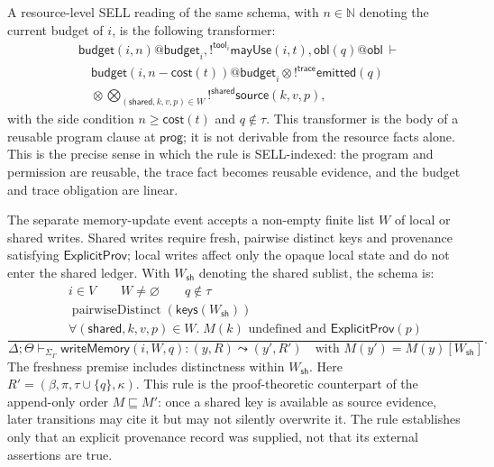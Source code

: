 \documentclass[a4paper,fleqn]{cas-sc}
\newcommand{\cost}{\mathsf{cost}}
\newcommand{\Nat}{\mathbb{N}}
\begin{document}
A resource-level SELL reading of the same schema, with
\(n\in\Nat\) denoting the current budget of \(i\), is the following transformer:
\[
\begin{aligned}
  &\mathsf{budget}(i,n)@\mathsf{budget}_i,
  !^{\mathsf{tool}_i}\mathsf{mayUse}(i,t),
  \mathsf{obl}(q)@\mathsf{obl}\ \vdash\\
  &\quad \mathsf{budget}(i,n-\cost(t))@\mathsf{budget}_i
  \otimes !^{\mathsf{trace}}\mathsf{emitted}(q)\\
  &\quad \otimes
  \bigotimes_{(\mathsf{shared},k,v,p)\in W}!^{\mathsf{shared}}\mathsf{source}(k,v,p),
\end{aligned}
\]
with the side condition \(n\ge \cost(t)\) and \(q\notin\tau\). This transformer is the body of a reusable program clause at \(\mathsf{prog}\); it is not derivable from the resource facts alone. This is the precise sense in which the rule is SELL-indexed: the program and permission are reusable, the trace fact becomes reusable evidence, and the budget and trace obligation are linear.

The separate memory-update event accepts a non-empty finite list \(W\) of
local or shared writes. Shared writes require fresh, pairwise distinct keys
and provenance satisfying \(\mathsf{ExplicitProv}\); local writes affect only the opaque local
state and do not enter the shared ledger. With
\(W_{\mathsf{sh}}\) denoting the shared sublist, the schema is:
\[
\frac{
  \begin{gathered}
  i\in V \qquad W\ne\varnothing \qquad q\notin\tau\\
  \operatorname{pairwiseDistinct}(\mathsf{keys}(W_{\mathsf{sh}}))\\
  \forall(\mathsf{shared},k,v,p)\in W.\;M(k)\text{ undefined and }\mathsf{ExplicitProv}(p)
  \end{gathered}
}{
  \Delta;\Theta\vdash_{\Sigma_{\Gamma}}
  \mathsf{writeMemory}(i,W,q):(y,R)\leadsto(y',R')
  \quad\text{with }M(y')=M(y)[W_{\mathsf{sh}}]
}.
\]
The freshness premise includes distinctness within \(W_{\mathsf{sh}}\).
Here \(R'=(\beta,\pi,\tau\cup\{q\},\kappa)\). This rule is the
proof-theoretic counterpart of the append-only order \(M\sqsubseteq M'\):
once a shared key is available as source evidence, later transitions may cite
it but may not silently overwrite it. The rule establishes only that an
explicit provenance record was supplied, not that its external assertions are
true.
\end{document}
